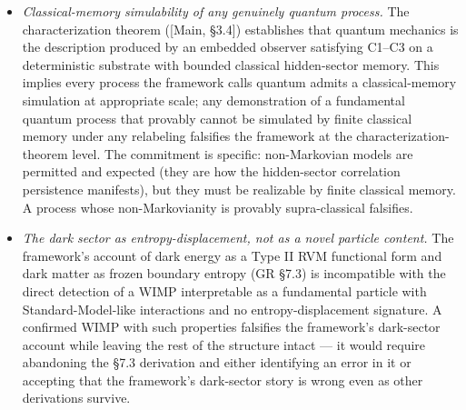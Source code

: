 \documentclass[
]{article}
\providecommand{\tightlist}{%
  \setlength{\itemsep}{0pt}\setlength{\parskip}{0pt}}
\begin{document}
\begin{itemize}
\tightlist
\item
  \emph{Classical-memory simulability of any genuinely quantum process.}
  The characterization theorem ({[}Main, §3.4{]}) establishes that
  quantum mechanics is the description produced by an embedded observer
  satisfying C1--C3 on a deterministic substrate with bounded classical
  hidden-sector memory. This implies every process the framework calls
  quantum admits a classical-memory simulation at appropriate scale; any
  demonstration of a fundamental quantum process that provably cannot be
  simulated by finite classical memory under any relabeling falsifies
  the framework at the characterization-theorem level. The commitment is
  specific: non-Markovian models are permitted and expected (they are
  how the hidden-sector correlation persistence manifests), but they
  must be realizable by finite classical memory. A process whose
  non-Markovianity is provably supra-classical falsifies.
\item
  \emph{The dark sector as entropy-displacement, not as a novel particle
  content.} The framework's account of dark energy as a Type II RVM
  functional form and dark matter as frozen boundary entropy (GR §7.3)
  is incompatible with the direct detection of a WIMP interpretable as a
  fundamental particle with Standard-Model-like interactions and no
  entropy-displacement signature. A confirmed WIMP with such properties
  falsifies the framework's dark-sector account while leaving the rest
  of the structure intact --- it would require abandoning the §7.3
  derivation and either identifying an error in it or accepting that the
  framework's dark-sector story is wrong even as other derivations
  survive.
\end{itemize}
\end{document}
